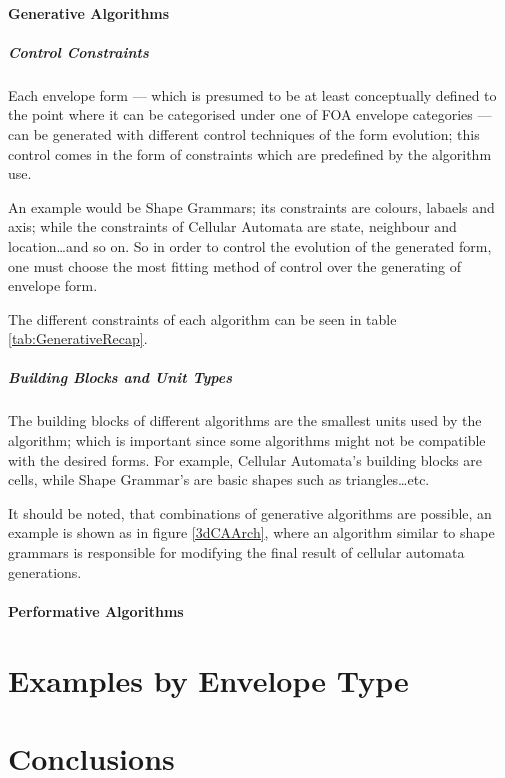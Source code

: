\paragraph{Generative Algorithms}\mbox{}

\subparagraph{Control Constraints}

Each envelope form --- which is presumed to be at least conceptually defined to the point where it can be categorised under one of FOA envelope categories --- can be generated with different control techniques of the form evolution; this control comes in the form of constraints which are predefined by the algorithm use.

An example would be Shape Grammars; its constraints are colours, labaels and axis; while the constraints of Cellular Automata are state, neighbour and location\ldots and so on. So in order to control the evolution of the generated form, one must choose the most fitting method of control over the generating of envelope form.

The different constraints of each algorithm can be seen in table \ref{tab:GenerativeRecap}.

\subparagraph{Building Blocks and Unit Types}

The building blocks of different algorithms are the smallest units used by the algorithm; which is important since some algorithms might not be compatible with the desired forms. For example, Cellular Automata's building blocks are cells, while Shape Grammar's are basic shapes such as triangles\ldots{}etc.

It should be noted, that combinations of generative algorithms are possible, an example is shown as in figure \ref{3dCAArch}, where an algorithm similar to shape grammars is responsible for modifying the final result of cellular automata generations.

\paragraph{Performative Algorithms}\mbox{}

\subparagraph{}

\section{Examples by Envelope Type}

\section{Conclusions}
